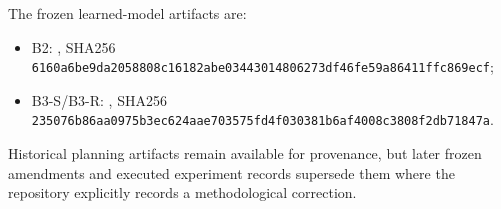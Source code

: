 \documentclass[10pt,twocolumn,letterpaper]{article}
\begin{document}
The frozen learned-model artifacts are:
\begin{itemize}
\item B2:
  , SHA256
  \texttt{6160a6be9da20588\allowbreak{}08c16182abe03443\allowbreak{}014806273df46fe5\allowbreak{}9a86411ffc869ecf};
\item B3-S/B3-R:
  , SHA256
  \texttt{235076b86aa0975b\allowbreak{}3ec624aae703575f\allowbreak{}d4f030381b6af400\allowbreak{}8c3808f2db71847a}.
\end{itemize}

Historical planning artifacts remain available for provenance, but later
frozen amendments and executed experiment records supersede them where the
repository explicitly records a methodological correction.
\end{document}
